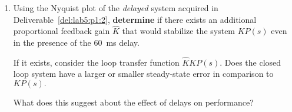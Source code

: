 \begin{deliverable}[label={lab5:report}]
\begin{enumerate}[label={(\arabic*)}]
{      In 4G/LTE communication networks the mean round trip time of a packet is around \SI{50}{\milli\second}.

      \textbf{Would} your uncompensated system be stable if the feedback loop involved communication over a similar wireless network with comparable delays?
      If not, would the compensated system be stable?
      \label{lab5:report:q6}
    }
    \item{%
      Using the Nyquist plot of the \emph{delayed} system acquired in Deliverable~\ref{del:lab5:p1:2}, \textbf{determine} if there exists an additional proportional feedback gain \(\hat{K}\) that would stabilize the system \(K P(s)\) even in the presence of the \SI{60}{\milli\second} delay.

      If it exists, consider the loop transfer function \(\hat{K} K P(s).\)
      Does the closed loop system have a larger or smaller steady-state error in comparison to \(K P(s).\)

      What does this suggest about the effect of delays on performance?
      \label{lab5:report:q7}
    }
  \end{enumerate}
\end{deliverable}

